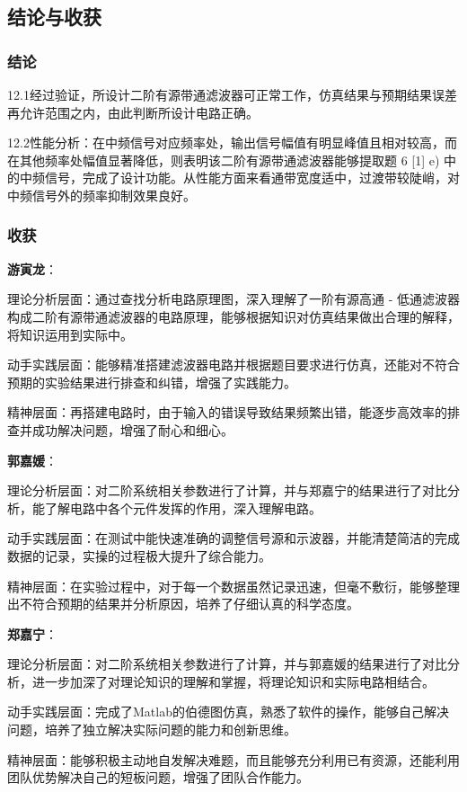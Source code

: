 \documentclass[./测控三级项目.tex]{subfiles} %
\begin{document}
	\subsection{结论与收获}
		\subsubsection{结论}
		12.1经过验证，所设计二阶有源带通滤波器可正常工作，仿真结果与预期结果误差再允许范围之内，由此判断所设计电路正确。\par
		12.2性能分析：在中频信号对应频率处，输出信号幅值有明显峰值且相对较高，而在其他频率处幅值显著降低，则表明该二阶有源带通滤波器能够提取题 6 [1] e) 中的中频信号，完成了设计功能。从性能方面来看通带宽度适中，过渡带较陡峭，对中频信号外的频率抑制效果良好。
		\subsubsection{收获}
		\textbf{游寅龙}：\par
		理论分析层面：通过查找分析电路原理图，深入理解了一阶有源高通 - 低通滤波器构成二阶有源带通滤波器的电路原理，能够根据知识对仿真结果做出合理的解释，将知识运用到实际中。\par
		动手实践层面：能够精准搭建滤波器电路并根据题目要求进行仿真，还能对不符合预期的实验结果进行排查和纠错，增强了实践能力。\par
		精神层面：再搭建电路时，由于输入的错误导致结果频繁出错，能逐步高效率的排查并成功解决问题，增强了耐心和细心。\par
		\textbf{郭嘉媛}：\par
		理论分析层面：对二阶系统相关参数进行了计算，并与郑嘉宁的结果进行了对比分析，能了解电路中各个元件发挥的作用，深入理解电路。\par
		动手实践层面：在测试中能快速准确的调整信号源和示波器，并能清楚简洁的完成数据的记录，实操的过程极大提升了综合能力。\par
		精神层面：在实验过程中，对于每一个数据虽然记录迅速，但毫不敷衍，能够整理出不符合预期的结果并分析原因，培养了仔细认真的科学态度。\par
		\textbf{郑嘉宁}：\par
		理论分析层面：对二阶系统相关参数进行了计算，并与郭嘉媛的结果进行了对比分析，进一步加深了对理论知识的理解和掌握，将理论知识和实际电路相结合。\par
		动手实践层面：完成了Matlab的伯德图仿真，熟悉了软件的操作，能够自己解决问题，培养了独立解决实际问题的能力和创新思维。\par
		精神层面：能够积极主动地自发解决难题，而且能够充分利用已有资源，还能利用团队优势解决自己的短板问题，增强了团队合作能力。
\end{document}
